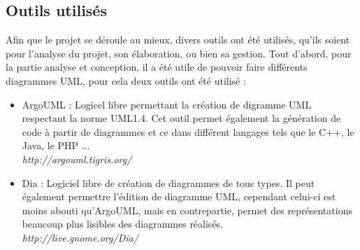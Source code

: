 \documentclass[11pt,a4paper]{article}
\begin{document}
		\subsection{Outils utilisés}
		
			Afin que le projet se déroule au mieux, divers outils ont été utilisés, qu'ils soient pour l'analyse du projet, son élaboration, ou bien sa gestion.
			Tout d'abord, pour la partie analyse et conception, il a été utile de pouvoir faire différents diagrammes UML, pour cela deux outils ont été utilisé :
			\begin{itemize}
				\item ArgoUML : Logicel libre permettant la création de digramme UML respectant la norme UML1.4. Cet outil permet également la génération de code à partir de diagrammes et ce dans différent langages tels que le C++, le Java, le PHP ...\\
				\textit{http://argouml.tigris.org/}
				\item Dia : Logiciel libre de création de diagrammes de tous types. Il peut également permettre l'édition de diagramme UML, cependant celui-ci est moins abouti qu'ArgoUML, mais en contrepartie, permet des représentations beaucoup plus lisibles des diagrammes réalisés.\\
				\textit{http://live.gnome.org/Dia/}
			\end{itemize} 
						
\end{document}
